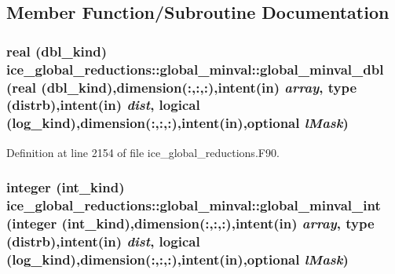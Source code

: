 \subsection{Member Function/Subroutine Documentation}
\hypertarget{interfaceice__global__reductions_1_1global__minval_a3ab7b811ed801129071ee11bc94def56}{
\subsubsection[{global\_\-minval\_\-dbl}]{\setlength{\rightskip}{0pt plus 5cm}real (dbl\_\-kind) ice\_\-global\_\-reductions::global\_\-minval::global\_\-minval\_\-dbl (real (dbl\_\-kind),dimension(:,:,:),intent(in) {\em array}, \/  type ({\bf distrb}),intent(in) {\em dist}, \/  logical (log\_\-kind),dimension(:,:,:),intent(in),optional {\em lMask})}}
\label{interfaceice__global__reductions_1_1global__minval_a3ab7b811ed801129071ee11bc94def56}


Definition at line 2154 of file ice\_\-global\_\-reductions.F90.\hypertarget{interfaceice__global__reductions_1_1global__minval_adaebbe5ed1d261e1b79bd8881b2d9eb7}{
\subsubsection[{global\_\-minval\_\-int}]{\setlength{\rightskip}{0pt plus 5cm}integer (int\_\-kind) ice\_\-global\_\-reductions::global\_\-minval::global\_\-minval\_\-int (integer (int\_\-kind),dimension(:,:,:),intent(in) {\em array}, \/  type ({\bf distrb}),intent(in) {\em dist}, \/  logical (log\_\-kind),dimension(:,:,:),intent(in),optional {\em lMask})}}
\label{interfaceice__global__reductions_1_1global__minval_adaebbe5ed1d261e1b79bd8881b2d9eb7}


